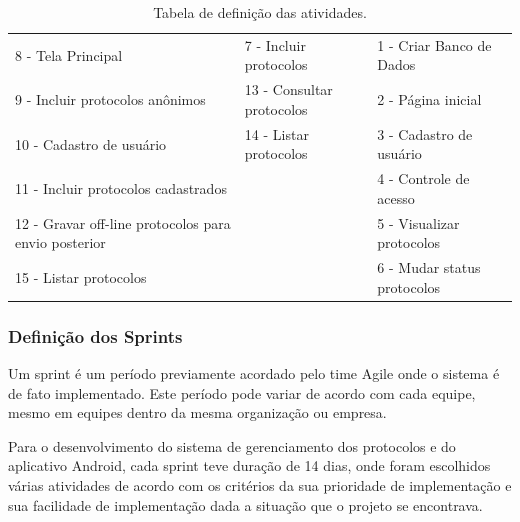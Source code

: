 \documentclass[
	article,			%
	11pt,				%
	oneside,			%
	a4paper,			%
	english,			%
	brazil,				%
	sumario=tradicional
	]{abntex2}
\begin{document}
\begin{table}[htbp]
    \caption{Tabela de definição das atividades.}
    \label{tabela-atividades}
    \begin{center}
        \begin{tabular}{|p{5cm}|p{4cm}|p{5cm}|}
            \hline
            8 - Tela Principal & 7 - Incluir protocolos & 1 - Criar Banco de Dados \\
            9 - Incluir protocolos anônimos & 13 - Consultar protocolos & 2 - Página inicial \\
            10 - Cadastro de usuário & 14 - Listar protocolos & 3 - Cadastro de usuário \\
            11 - Incluir protocolos cadastrados & & 4 - Controle de acesso \\
            12 - Gravar off-line protocolos para envio posterior & & 5 - Visualizar protocolos \\
            15 - Listar protocolos & & 6 - Mudar status protocolos \\
            \hline
        \end{tabular}
    \end{center}
\end{table}

\subsubsection{Definição dos Sprints}

Um sprint é um período previamente acordado pelo time Agile onde o sistema é de fato implementado.
Este período pode variar de acordo com cada equipe, mesmo em equipes dentro da mesma organização ou empresa.

Para o desenvolvimento do sistema de gerenciamento dos protocolos e do aplicativo Android, cada sprint teve duração de 14 dias, onde foram escolhidos várias atividades de acordo com os critérios da sua prioridade de implementação e sua facilidade de implementação dada a situação que o projeto se encontrava.
\end{document}
